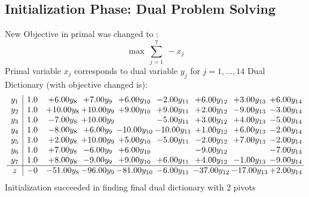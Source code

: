 \documentclass[9pt]{article}
\begin{document}
\subsection{Initialization Phase: Dual Problem Solving}
New Objective in primal was changed to : \[ \max\ \sum_{j=1}^{7}\ - x_j \] 
Primal variable $x_j$ corresponds to dual variable $y_j$ for $j = 1,\ldots,14$
Dual Dictionary (with objective changed is): 
\[\begin{array}{c| c c@{\hskip 2pt} c@{\hskip 2pt} c@{\hskip 2pt} c@{\hskip 2pt} c@{\hskip 2pt} c@{\hskip 2pt} c@{\hskip 2pt} }
 y_{1}   &  1.0 & +  6.00 y_{8} & +  7.00 y_{9} & +  6.00 y_{10} & -2.00 y_{11} & +  6.00 y_{12} & +  3.00 y_{13} & +  6.00 y_{14}\\
 y_{2}   &  1.0 & + 10.00 y_{8} & + 10.00 y_{9} & +  9.00 y_{10} & +  9.00 y_{11} & +  2.00 y_{12} & -9.00 y_{13} & -3.00 y_{14}\\
 y_{3}   &  1.0 & -7.00 y_{8} & + 10.00 y_{9} &   & -5.00 y_{11} & +  3.00 y_{12} & +  4.00 y_{13} & -5.00 y_{14}\\
 y_{4}   &  1.0 & -8.00 y_{8} & +  6.00 y_{9} & -10.00 y_{10} & -10.00 y_{11} & +  1.00 y_{12} & +  6.00 y_{13} & -2.00 y_{14}\\
 y_{5}   &  1.0 & +  2.00 y_{8} & + 10.00 y_{9} & +  5.00 y_{10} & -5.00 y_{11} & -2.00 y_{12} & +  7.00 y_{13} & -2.00 y_{14}\\
 y_{6}   &  1.0 & +  7.00 y_{8} & -6.00 y_{9} & +  6.00 y_{10} &   & -9.00 y_{12} &   & -7.00 y_{14}\\
 y_{7}   &  1.0 & +  8.00 y_{8} & -9.00 y_{9} & +  9.00 y_{10} & +  6.00 y_{11} & +  4.00 y_{12} & -1.00 y_{13} & -9.00 y_{14}\\
\hline
z    &  -0 & -51.00 y_{8} & -96.00 y_{9} & -81.00 y_{10} & -6.00 y_{11} & -37.00 y_{12} & -17.00 y_{13} & +  2.00 y_{14}\\
\end{array}\]
Initialization succeeded in finding final dual dictionary with 2 pivots
\end{document}
